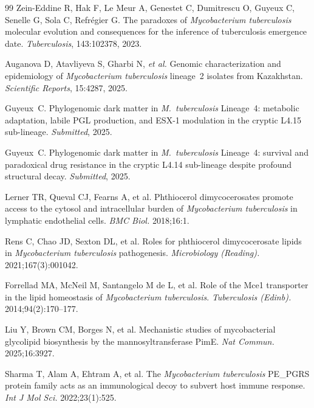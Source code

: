 \documentclass[11pt,a4paper]{article}
\begin{document}
\begin{thebibliography}{99}
	Zein-Eddine R, Hak F, Le Meur A, Genestet C, Dumitrescu O, Guyeux C,
	Senelle G, Sola C, Refr\'egier G.
	The paradoxes of \textit{Mycobacterium tuberculosis} molecular evolution
	and consequences for the inference of tuberculosis emergence date.
	\textit{Tuberculosis}, 143:102378, 2023.

	Auganova D, Atavliyeva S, Gharbi N, \textit{et al.}
	Genomic characterization and epidemiology of \textit{Mycobacterium tuberculosis}
	lineage~2 isolates from Kazakhstan.
	\textit{Scientific Reports}, 15:4287, 2025.


	Guyeux~C.
	Phylogenomic dark matter in \textit{M.~tuberculosis} Lineage~4:
	metabolic adaptation, labile PGL production, and ESX-1 modulation
	in the cryptic L4.15 sub-lineage.
	\textit{Submitted}, 2025.

	Guyeux~C.
	Phylogenomic dark matter in \textit{M.~tuberculosis} Lineage~4:
	survival and paradoxical drug resistance in the cryptic L4.14
	sub-lineage despite profound structural decay.
	\textit{Submitted}, 2025.

	Lerner TR, Queval CJ, Fearns A, et al.
	Phthiocerol dimycocerosates promote access to the cytosol and intracellular burden of \textit{Mycobacterium tuberculosis} in lymphatic endothelial cells.
	\textit{BMC Biol.} 2018;16:1.

	Rens C, Chao JD, Sexton DL, et al.
	Roles for phthiocerol dimycocerosate lipids in \textit{Mycobacterium tuberculosis} pathogenesis.
	\textit{Microbiology (Reading).} 2021;167(3):001042.

	Forrellad MA, McNeil M, Santangelo M de L, et al.
	Role of the Mce1 transporter in the lipid homeostasis of \textit{Mycobacterium tuberculosis}.
	\textit{Tuberculosis (Edinb).} 2014;94(2):170--177.

	Liu Y, Brown CM, Borges N, et al.
	Mechanistic studies of mycobacterial glycolipid biosynthesis by the mannosyltransferase PimE.
	\textit{Nat Commun.} 2025;16:3927.

	Sharma T, Alam A, Ehtram A, et al.
	The \textit{Mycobacterium tuberculosis} PE\_PGRS protein family acts as an immunological decoy to subvert host immune response.
	\textit{Int J Mol Sci.} 2022;23(1):525.


\end{thebibliography}
\end{document}
